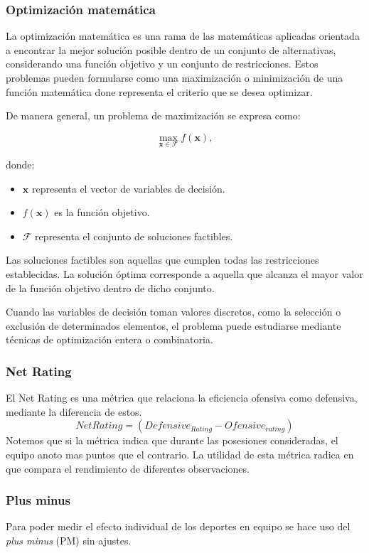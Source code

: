 \subsubsection{Optimización matemática}
La optimización matemática es una rama de las matemáticas
aplicadas orientada a encontrar la mejor solución posible dentro
de un conjunto de alternativas, considerando una función objetivo
y un conjunto de restricciones. Estos problemas pueden formularse
como una maximización o minimización de una función matemática
done representa el criterio que se desea optimizar. \cite{ibm_optimization_model}

De manera general, un problema de maximización se expresa como:

\begin{equation}
    \max_{\mathbf{x} \in \mathcal{F}} f(\mathbf{x}),
\end{equation}

donde:

\begin{itemize}
    \item $\mathbf{x}$ representa el vector de variables de decisión.
    \item $f(\mathbf{x})$ es la función objetivo.
    \item $\mathcal{F}$ representa el conjunto de soluciones factibles.
\end{itemize}

Las soluciones factibles son aquellas que cumplen todas las
restricciones establecidas. La solución óptima corresponde a
aquella que alcanza el mayor valor de la función objetivo dentro
de dicho conjunto.

Cuando las variables de decisión toman valores discretos, como
la selección o exclusión de determinados elementos, el problema
puede estudiarse mediante técnicas de optimización entera o
combinatoria. \cite{boyd2004convex}

\subsubsection{Net Rating}
El Net Rating es una métrica que relaciona la eficiencia ofensiva como defensiva, mediante la diferencia de estos.
$$NetRating=(Defensive_{Rating}-Ofensive_{rating})$$
Notemos que si la métrica indica que durante las posesiones consideradas, el equipo anoto mas puntos que el contrario. La utilidad de esta métrica radica en que compara el rendimiento de diferentes observaciones.
\cite{zuccolotto2020basketball,gaitan_netrating}
\subsubsection{Plus minus}
Para poder medir el efecto individual de los deportes en equipo se hace uso del \textit{plus minus} (PM) sin ajustes.

